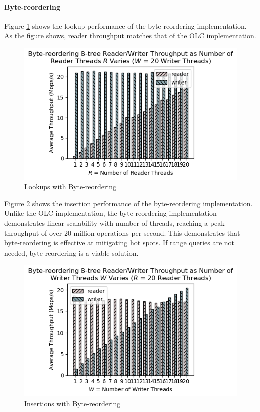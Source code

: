 \documentclass[twocolumn]{article}
\begin{document}
\paragraph{Byte-reordering}

Figure \ref{fig:brlookup} shows the lookup performance of the byte-reordering
implementation. As the figure shows, reader throughput matches that of the OLC
implementation.

\begin{figure}[ht]
    \centering \includegraphics[width=\columnwidth]{figures/br_w20_r1-20_avg.png}
    \caption{Lookups with Byte-reordering \label{fig:brlookup}}
\end{figure}

Figure \ref{fig:brinsert} shows the insertion performance of the
byte-reordering implementation. Unlike the OLC implementation, the
byte-reordering implementation demonstrates linear scalability with number of
threads, reaching a peak throughput of over 20 million operations per second.
This demonstrates that byte-reordering is effective at mitigating hot spots. If
range queries are not needed, byte-reordering is a viable solution.

\begin{figure}[ht]
    \centering \includegraphics[width=\columnwidth]{figures/br_r20_w1-20_avg.png}
    \caption{Insertions with Byte-reordering \label{fig:brinsert}}
\end{figure}
\end{document}
